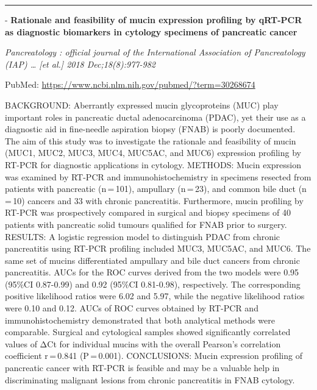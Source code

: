 \documentclass[]{article}
\begin{document}
{}

{}

\begin{center}\rule{0.5\linewidth}{\linethickness}\end{center}

 - \textbf{Rationale and feasibility of mucin expression profiling by
qRT-PCR as diagnostic biomarkers in cytology specimens of pancreatic
cancer}

\emph{Pancreatology : official journal of the International Association
of Pancreatology (IAP) \ldots{} {[}et al.{]} 2018 Dec;18(8):977-982}

PubMed: \url{https://www.ncbi.nlm.nih.gov/pubmed/?term=30268674}

BACKGROUND: Aberrantly expressed mucin glycoproteins (MUC) play
important roles in pancreatic ductal adenocarcinoma (PDAC), yet their
use as a diagnostic aid in fine-needle aspiration biopsy (FNAB) is
poorly documented. The aim of this study was to investigate the
rationale and feasibility of mucin (MUC1, MUC2, MUC3, MUC4, MUC5AC, and
MUC6) expression profiling by RT-PCR for diagnostic applications in
cytology. METHODS: Mucin expression was examined by RT-PCR and
immunohistochemistry in specimens resected from patients with pancreatic
(n\,=\,101), ampullary (n\,=\,23), and common bile duct (n\,=\,10)
cancers and 33 with chronic pancreatitis. Furthermore, mucin profiling
by RT-PCR was prospectively compared in surgical and biopsy specimens of
40 patients with pancreatic solid tumours qualified for FNAB prior to
surgery. RESULTS: A logistic regression model to distinguish PDAC from
chronic pancreatitis using RT-PCR profiling included MUC3, MUC5AC, and
MUC6. The same set of mucins differentiated ampullary and bile duct
cancers from chronic pancreatitis. AUCs for the ROC curves derived from
the two models were 0.95 (95\%CI 0.87-0.99) and 0.92 (95\%CI 0.81-0.98),
respectively. The corresponding positive likelihood ratios were 6.02 and
5.97, while the negative likelihood ratios were 0.10 and 0.12. AUCs of
ROC curves obtained by RT-PCR and immunohistochemistry demonstrated that
both analytical methods were comparable. Surgical and cytological
samples showed significantly correlated values of ΔCt for individual
mucins with the overall Pearson's correlation coefficient r\,=\,0.841
(P\,=\,0.001). CONCLUSIONS: Mucin expression profiling of pancreatic
cancer with RT-PCR is feasible and may be a valuable help in
discriminating malignant lesions from chronic pancreatitis in FNAB
cytology.

{}
\end{document}

